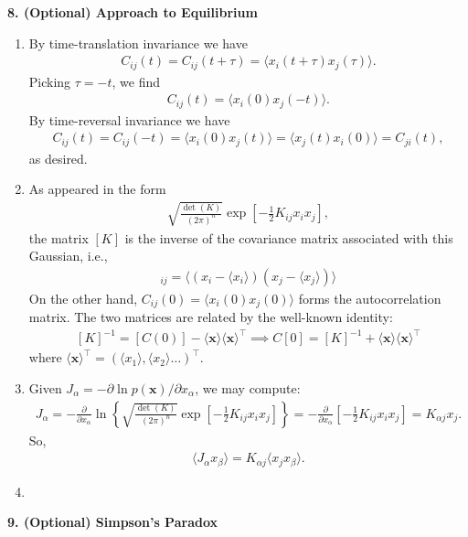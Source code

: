 \documentclass{article}
\theoremstyle{definition}
\newcommand{\p}{\partial}
\newcommand{\al}{\alpha}
\newcommand{\be}{\beta}
\newcommand{\f}[2]{\frac{#1}{#2}}
\newcommand{\lb}{\left[}
\newcommand{\rb}{\right]}
\newcommand{\lc}{\left\{}
\newcommand{\rc}{\right\}}
\begin{document}
\noindent \textbf{8. (Optional) Approach to Equilibrium}
\begin{enumerate}[label=(\alph*)]
	\item By time-translation invariance we have
	\begin{align*}
	C_{ij}(t) = C_{ij}(t+\tau) = \langle x_i(t+\tau) x_j (\tau) \rangle.
	\end{align*}
	Picking $\tau = -t$, we find 
	\begin{align*}
	C_{ij}(t) = \langle x_i(0)x_j(-t)\rangle.
	\end{align*}
	By time-reversal invariance we have
	\begin{align*}
	C_{ij}(t) = C_{ij}(-t) = \langle  x_i (0) x_j(t) \rangle = \langle  x_j (t) x_i(0) \rangle = C_{ji}(t),
	\end{align*}
	as desired. 
	
	\item As appeared in the form 
	\begin{align*}
	\sqrt{\f{\det(K)}{(2\pi)^{n}}} \exp\lb -\f{1}{2}K_{ij} x_i x_j \rb,
	\end{align*}
	the matrix $[K]$ is the inverse of the covariance matrix associated with this Gaussian, i.e., 
	\begin{align*}
	[K^{-1}]_{ij} = \langle (x_i -\langle x_i \rangle)(x_j - \langle x_j \rangle) \rangle 
	\end{align*}
	On the other hand, $C_{ij}(0) = \langle x_i(0)x_j(0) \rangle $ forms the autocorrelation matrix. The two matrices are related by the well-known identity:
	\begin{align*}
	\boxed{[K]^{-1} = [C(0)] - \langle \mathbf{x}\rangle \langle \mathbf{x}\rangle^\top \implies C[0] = [K]^{-1} + \langle \mathbf{x}\rangle \langle \mathbf{x}\rangle^\top}
	\end{align*}
	where $\langle \mathbf{x}\rangle^\top = (\langle x_1 \rangle, \langle x_2 \rangle \dots  )^\top$. 
	
	
	
	\item Given $J_\al = -\p \ln p(\mathbf{x})/\p x_\al$, we may compute:
	\begin{align*}
	J_\al = -\f{\p}{\p x_\al}\ln \lc \sqrt{\f{\det(K)}{(2\pi)^{n}}}  \exp\lb -\f{1}{2}K_{ij} x_i x_j \rb \rc = -\f{\p}{\p x_\al} \lb -\f{1}{2} K_{ij}x_ix_j \rb = K_{\al j} x_j.
	\end{align*}
	So, 
	\begin{align*}
	\langle J_\al x_\be \rangle = K_{\al j}\langle x_j x_\beta\rangle.
	\end{align*}
	
	
	\item 
\end{enumerate}

\noindent \textbf{9. (Optional) Simpson's Paradox}

 
\end{document}
